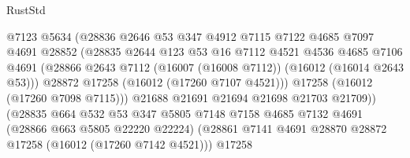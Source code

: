 \begin{lexlean}{RustStd}
\begin{coremodule}
                                  @7123
                                  @5634
                                  (@28836
                                    @2646
                                    @53
                                    @347
                                    @4912
                                    @7115
                                    @7122
                                    @4685
                                    @7097
                                    @4691
                                    @28852
                                    (@28835
                                      @2644
                                      @123
                                      @53
                                      @16
                                      @7112
                                      @4521
                                      @4536
                                      @4685
                                      @7106
                                      @4691
                                      (@28866
                                        @2643
                                        @7112
                                        (@16007 (@16008 @7112))
                                        (@16012 (@16014 @2643 @53)))
                                      @28872
                                      @17258
                                      (@16012 (@17260 @7107 @4521)))
                                    @17258
                                    (@16012 (@17260 @7098 @7115)))
                                  @21688
                                  @21691
                                  @21694
                                  @21698
                                  @21703
                                  @21709))
                              (@28835
                                @664
                                @532
                                @53
                                @347
                                @5805
                                @7148
                                @7158
                                @4685
                                @7132
                                @4691
                                (@28866 @663 @5805 @22220 @22224)
                                (@28861
                                  @7141
                                  @4691
                                  @28870
                                  @28872
                                  @17258
                                  (@16012 (@17260 @7142 @4521)))
                                @17258

\end{coremodule}
\end{lexlean}
